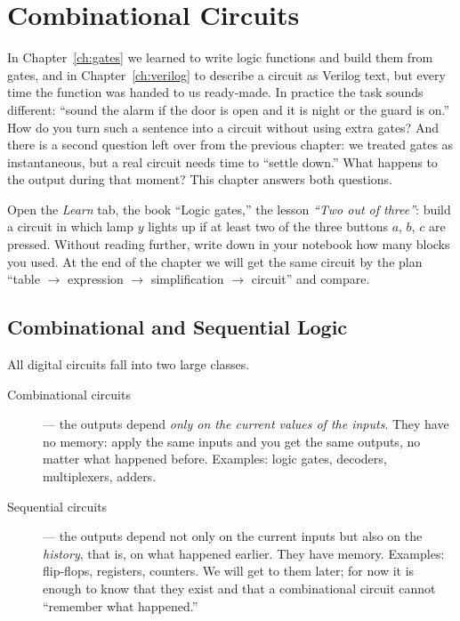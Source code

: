 \chapter{Combinational Circuits}
\label{ch:comb}

In Chapter~\ref{ch:gates} we learned to write logic functions and build them
from gates, and in Chapter~\ref{ch:verilog} to describe a circuit as Verilog
text, but every time the function was handed to us ready-made. In
practice the task sounds different: ``sound the alarm if the door is open and
it is night or the guard is on.'' How do you turn such a sentence into a
circuit without using extra gates? And there is a second question left over
from the previous chapter: we treated gates as instantaneous, but a real
circuit needs time to ``settle down.'' What happens to the output during that
moment? This chapter answers both questions.

\begin{buildbox}
Open the \emph{Learn} tab, the book ``Logic gates,'' the lesson
\emph{``Two out of three''}: build a circuit in which lamp $y$ lights up if at
least two of the three buttons $a$, $b$, $c$ are pressed. Without reading
further, write down in your notebook how many blocks you used. At the end of
the chapter we will get the same circuit by the plan ``table $\to$
expression $\to$ simplification $\to$ circuit'' and compare.
\end{buildbox}

\section{Combinational and Sequential Logic}

All digital circuits fall into two large classes.

\begin{description}
  \item[Combinational circuits] --- the outputs depend \emph{only on the
    current values of the inputs}. They have no memory: apply the same inputs
    and you get the same outputs, no matter what happened before. Examples:
    logic gates, decoders, multiplexers, adders.
  \item[Sequential circuits] --- the outputs depend not only on the current
    inputs but also on the \emph{history}, that is, on what happened earlier.
    They have memory. Examples: flip-flops, registers, counters. We will get
    to them later; for now it is enough to know that they exist and that a
    combinational circuit cannot ``remember what happened.''
\end{description}

